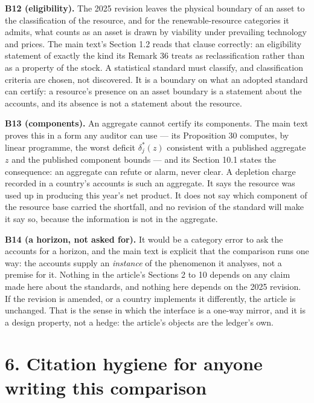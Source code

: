 \documentclass[11pt]{article}
\begin{document}
\textbf{B12 (eligibility).} The 2025 revision leaves the physical boundary of an asset to the classification of the resource, and for the renewable-resource categories it admits, what counts as an asset is drawn by viability under prevailing technology and prices. The main text's Section 1.2 reads that clause correctly: an eligibility statement of exactly the kind its Remark 36 treats as reclassification rather than as a property of the stock. A statistical standard must classify, and classification criteria are chosen, not discovered. It is a boundary on what an adopted standard can certify: a resource's presence on an asset boundary is a statement about the accounts, and its absence is not a statement about the resource.

\textbf{B13 (components).} An aggregate cannot certify its components. The main text proves this in a form any auditor can use --- its Proposition 30 computes, by linear programme, the worst deficit \(\delta_j^{\ast}(z)\) consistent with a published aggregate \(z\) and the published component bounds --- and its Section 10.1 states the consequence: an aggregate can refute or alarm, never clear. A depletion charge recorded in a country's accounts is such an aggregate. It says the resource was used up in producing this year's net product. It does not say which component of the resource base carried the shortfall, and no revision of the standard will make it say so, because the information is not in the aggregate.

\textbf{B14 (a horizon, not asked for).} It would be a category error to ask the accounts for a horizon, and the main text is explicit that the comparison runs one way: the accounts supply an \emph{instance} of the phenomenon it analyses, not a premise for it. Nothing in the article's Sections 2 to 10 depends on any claim made here about the standards, and nothing here depends on the 2025 revision. If the revision is amended, or a country implements it differently, the article is unchanged. That is the sense in which the interface is a one-way mirror, and it is a design property, not a hedge: the article's objects are the ledger's own.

\vspace{0.8em}

\section*{6. Citation hygiene for anyone writing this comparison}\label{6-citation-hygiene-for-anyone-writing-this-comparison}
\end{document}
